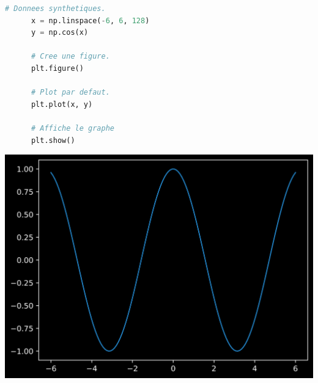 \documentclass[aspectratio=169]{beamer}
\begin{document}
{
}




\begin{frame}[fragile]{}{}
  \vfill
  \begin{minipage}{.48\textwidth}
    \begin{lstlisting}[language=Python]
      # Donnees synthetiques.
      x = np.linspace(-6, 6, 128)
      y = np.cos(x)

      # Cree une figure.
      plt.figure()

      # Plot par defaut.
      plt.plot(x, y)

      # Affiche le graphe
      plt.show()
    \end{lstlisting}
  \end{minipage}%
  \hfill
  \begin{minipage}{.48\textwidth}
    \centering
    \includegraphics[width=\textwidth]{line_plot_default}
  \end{minipage}
  \vfill
\end{frame}
\end{document}

